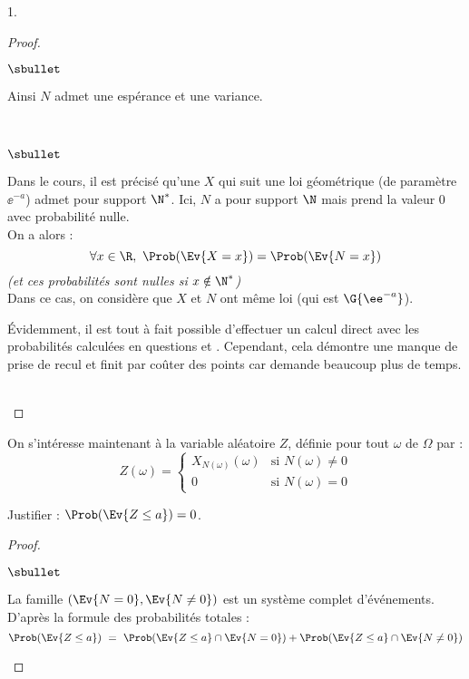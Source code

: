 \documentclass[11pt]{article}%
\begin{document}
\begin{noliste}{1.}
\begin{proof}
\begin{noliste}{$\sbullet$}
  \item Ainsi $N$ admet une espérance et une variance. %
  \end{noliste}
  \begin{remark}~
    \begin{noliste}{$\sbullet$}
    \item Dans le cours, il est précisé qu'une \var $X$ qui suit une
      loi géométrique (de paramètre $\ee^{-a}$) admet pour support
      $\N^*$. Ici, $N$ a pour support $\N$ mais prend la valeur $0$
      avec probabilité nulle.\\
      On a alors :
      \[
      \forall x \in \R, \ \Prob(\Ev{X = x}) = \Prob(\Ev{N = x})
      \]
      {\it (et ces probabilités sont nulles si $x \notin \N^*$)}\\
      Dans ce cas, on considère que $X$ et $N$ ont même loi (qui est
      $\G{\ee^{-a}}$).

    \item Évidemment, il est tout à fait possible d'effectuer un
      calcul direct avec les probabilités calculées en questions
       et . Cependant, cela démontre une manque de
      prise de recul et finit par coûter des points car demande
      beaucoup plus de temps.
    \end{noliste}
  \end{remark}~\\[-1.4cm]
 \end{proof}
\noindent 
 On s'intéresse maintenant à la variable aléatoire $Z$, définie pour 
 tout $\omega$ de $\Omega$ par :\\ 
 \[
  Z(\omega)=\left\{
  \begin{array}{cl}
   X_{N(\omega)}(\omega) & \text{si } N(\omega)\neq 0\\[.2cm]
   0 & \text{si } N(\omega)=0
  \end{array}
  \right.
 \]


\newpage

 
\item Justifier : $\Prob(\Ev{Z\leq a})=0$.
 
  \begin{proof}~
    \begin{noliste}{$\sbullet$}
    \item La famille $(\Ev{N=0}, \Ev{N\neq 0})$ est un système complet
      d'événements.\\
      D'après la formule des probabilités totales :
      \[
      \Prob(\Ev{Z\leq a}) \ = \ \Prob(\Ev{Z\leq a} \cap \Ev{N=0}) +
      \Prob(\Ev{Z \leq a} \cap \Ev{N \neq 0})
      \]


\end{noliste}
\end{proof}
\end{noliste}
\end{document}
